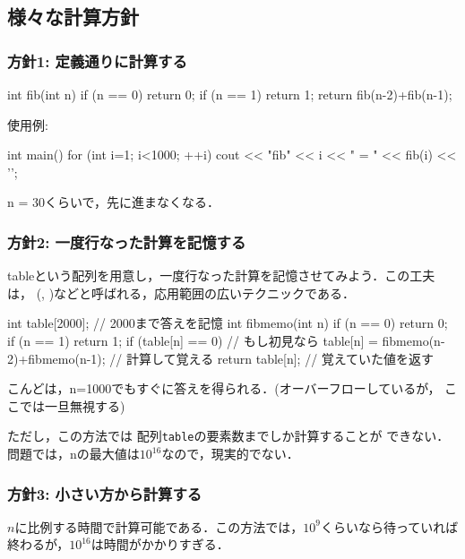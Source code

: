 \subsection{様々な計算方針}\label{section:fibonacci}

\subsubsection*{方針1: 定義通りに計算する} 

\begin{cbox}
int fib(int n) {
    if (n == 0) return 0;
    if (n == 1) return 1;
    return fib(n-2)+fib(n-1);
}
\end{cbox}

使用例:

\begin{cbox}
int main() {
  for (int i=1; i<1000; ++i)
    cout << "fib" << i << " = " << fib(i) << '\n';
}
\end{cbox}

n = 30くらいで，先に進まなくなる．

\subsubsection*{方針2: 一度行なった計算を記憶する}\label{section:memoization}

tableという配列を用意し，一度行なった計算を記憶させてみよう．この工夫は，
(, 
)などと呼ばれる，応用範囲の広いテクニックである．

\begin{cbox}
int table[2000]; // 2000まで答えを記憶
int fibmemo(int n) {
    if (n == 0) return 0;
    if (n == 1) return 1;
    if (table[n] == 0) // もし初見なら
      table[n] = fibmemo(n-2)+fibmemo(n-1); // 計算して覚える
    return table[n]; // 覚えていた値を返す
}
\end{cbox}

こんどは，n=1000でもすぐに答えを得られる．(オーバーフローしているが，
ここでは一旦無視する)

ただし，この方法では 配列\texttt{table}の要素数までしか計算することが
できない．問題では，nの最大値は$10^{16}$なので，現実的でない．


\subsubsection*{方針3: 小さい方から計算する}
$n$に比例する時間で計算可能である．この方法では，$10^{9}$くらいなら待っていれば終わるが，$10^{16}$は時間がかかりすぎる．

